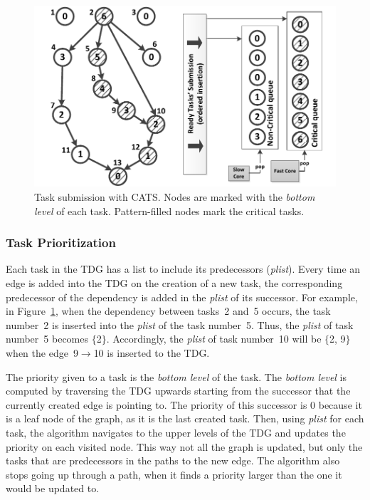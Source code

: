\begin{figure}[t]
\includegraphics[width=\columnwidth]{images/fig_1.pdf} 
\centering
\caption{Task submission with CATS. Nodes are marked with the \textit{bottom level} of each task. Pattern-filled nodes mark the critical tasks.}
\label{botlevels}
\vspace{-0.5cm}
\end{figure}


\subsubsection{Task Prioritization}

Each task in the TDG has a list to include its predecessors (\textit{plist}). Every time an edge is added into the TDG on the creation of a new task, the corresponding predecessor of the dependency is added in the \textit{plist} of its successor. For example, in Figure~\ref{botlevels}, when the dependency between tasks~2 and~5 occurs, the task number~2 is inserted into the \textit{plist} of the task number~5. Thus, the \textit{plist} of task number~5 becomes $\{$2$\}$. Accordingly, the \textit{plist} of task number~10 will be $\{$2, 9$\}$ when the edge~9$\rightarrow$10 is inserted to the TDG. 


The priority given to a task is the \textit{bottom level} of the task. The \textit{bottom level} is computed by traversing the TDG upwards starting from the successor that the currently created edge is pointing to. The priority of this successor is 0 because it is a leaf node of the graph, as it is the last created task. Then, using \textit{plist} for each task, the algorithm navigates to the upper levels of the TDG and updates the priority on each visited node. This way not all the graph is updated, but only the tasks that are predecessors in the paths to the new edge. The algorithm also stops going up through a path, when it finds a priority larger than the one it would be updated to.

